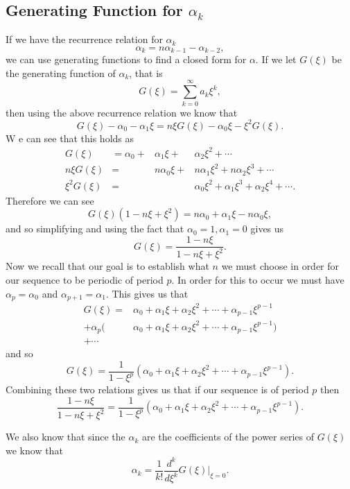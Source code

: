 \documentclass[12pt]{article}
\begin{document}
\subsection{Generating Function for $\alpha_k$}
If we have the recurrence relation for $\alpha_k$ 
\begin{equation*}
\alpha_k = n \alpha_{k-1} - \alpha_{k-2}, 
\end{equation*}
we can use generating functions to find a closed form for $\alpha$. If we let $G(\xi)$ be the generating function of $\alpha_k$, that is 
\begin{equation*}
G(\xi) = \sum_{k=0}^{\infty} a_k \xi^k,
\end{equation*}
then using the above recurrence relation we know that 
\begin{equation*}
G(\xi) -\alpha_0 - \alpha_1 \xi = n \xi G(\xi) - \alpha_0 \xi - \xi^2 G(\xi).
\end{equation*}
W e can see that this holds as 
\begin{align*}
G(\xi) &= \alpha_0 + &\alpha_1 \xi + &\alpha_2 \xi^2 + \cdots \\
n \xi G(\xi) &= &n\alpha_0 \xi + &n\alpha_1 \xi^2 + n\alpha_2 \xi^3 + \cdots \\
\xi^2 G(\xi) &= &&\alpha_0 \xi^2 + \alpha_1 \xi^3 + \alpha_2 \xi^4 + \cdots.
\end{align*}
Therefore we can see 
\begin{equation*}
G( \xi) (1-n \xi + \xi^2) = n\alpha_0 + \alpha_1 \xi - n\alpha_0 \xi,
\end{equation*}
and so simplifying and using the fact that $\alpha_0=1, \alpha_1=0$ gives us 
\begin{equation*}
G(\xi) = \frac{ 1 - n\xi}{1 - n \xi + \xi^2} .
\end{equation*}
Now we recall that our goal is to establish what $n$ we must choose in order for our sequence to be periodic of period $p$. In order for this to occur we must have $\alpha_p= \alpha_0$ and $\alpha_{p+1} = \alpha_1$. This gives us that 
\begin{align*}
G(\xi) = &\alpha_0 + \alpha_1 \xi + \alpha_2 \xi^2 + \cdots + \alpha_{p-1} \xi^{p-1} \\
+ \alpha_p(&\alpha_0 + \alpha_1 \xi + \alpha_2 \xi^2 + \cdots + \alpha_{p-1} \xi^{p-1}) \\ 
+ \cdots 
\end{align*}
and so 
\begin{equation*}
G(\xi) = \frac{1}{1- \xi^p} (\alpha_0 + \alpha_1 \xi + \alpha_2 \xi^2 + \cdots + \alpha_{p-1} \xi^{p-1}).
\end{equation*}
Combining these two relations gives us that if our sequence is of period $p$ then 
\begin{equation*}
\frac{ 1 - n\xi}{1 - n \xi + \xi^2} = \frac{1}{1- \xi^p} (\alpha_0 + \alpha_1 \xi + \alpha_2 \xi^2 + \cdots + \alpha_{p-1} \xi^{p-1}).
\end{equation*}

We also know that since the $\alpha_k$ are the coefficients of the power series of $G(\xi)$ we know that 
\begin{equation*}
\alpha_k = \frac{1}{k!} \frac{d^k}{d \xi^k} G(\xi) |_{\xi=0}.
\end{equation*}
\end{document}
